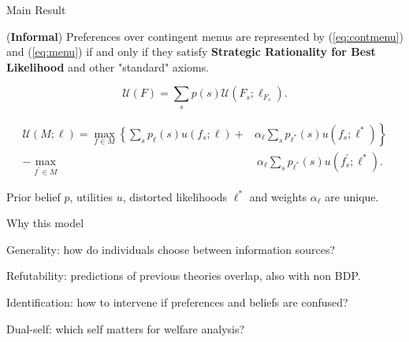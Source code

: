\documentclass[usenames,dvipsnames,aspectratio=169,11pt]{beamer}
\begin{document}
\begin{frame}{Main Result}\label{mainresult}

	\begin{theorem}
		(\textbf{Informal}) Preferences over contingent menus are represented by (\ref{eq:contmenu}) and (\ref{eq:menu}) if and only if they satisfy \textbf{Strategic Rationality for Best Likelihood} and other "standard" axioms.
	\end{theorem}

	\vfill

	\begin{equation}\label{eq:contmenu}
		\mathscr{U}(F)= \sum_{s} p \left( s \right) \mathcal{U} \left(F_{s} ; \ell_{F_{s}} \right) .
	\end{equation}

	\vfill

	\begin{equation}\label{eq:menu}
		\begin{aligned}
			\mathcal{U} \left(M ; \ell \right) = \max _{f \in M}\left\{\sum_{s} p_{\ell} \left( s \right) u \left( f_{s} ; \ell \right) + \right. & \left. \alpha_{\ell} \sum_{s} p_{\ell^{*}} \left( s \right) u \left( f_{s} ; \ell^{*} \right) \right\} \\
			-\max _{f^{\prime} \in M}                                                                                                             & \: \alpha _{\ell} \sum_{s} p_{\ell^{*}} \left( s \right) u\left(f^{\prime}_{s} ; \ell^{*} \right) .
		\end{aligned}
	\end{equation}

	\vfill

	Prior belief \( p \), utilities \( u \), distorted likelihoods \( \ell^{*} \) and weights \( \alpha_{\ell} \) are unique. \hyperlink{axiomsb1main}{}

\end{frame}

\begin{frame}{Why this model}

	\begin{wideenumerate}
		\item Generality: how do individuals choose between information sources? \vfill
		\item Refutability: predictions of previous theories overlap, also with non BDP. \vfill
		\item Identification: how to intervene if preferences and beliefs are confused? \vfill
		\item Dual-self: which self matters for welfare analysis?
	\end{wideenumerate}

\end{frame}
\end{document}
